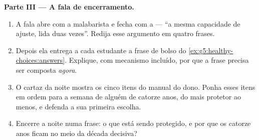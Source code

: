 \begin{problem}
\medskip\noindent\textbf{Parte III --- A fala de
encerramento.}
\begin{enumerate}[resume]
  \item A fala abre com a malabarista e fecha com a  ---
        ``a mesma capacidade de ajuste, lida duas vezes''. Redija esse
        argumento em quatro frases.
  \item Depois ela entrega a cada estudante a frase de bolso do
        \cref{ex:g5:healthy-choices:answers}. Explique, com mecanismo
        incluído, por que a frase precisa ser composta \emph{agora}.
  \item O cartaz da noite mostra os cinco itens do manual do dono.
        Ponha esses itens em ordem para a semana de alguém de catorze
        anos, do mais protetor ao menos, e defenda a sua primeira
        escolha.
  \item Encerre a noite numa frase: o que está sendo protegido, e por
        que os catorze anos ficam no meio da década decisiva?
\end{enumerate}
\end{problem}
